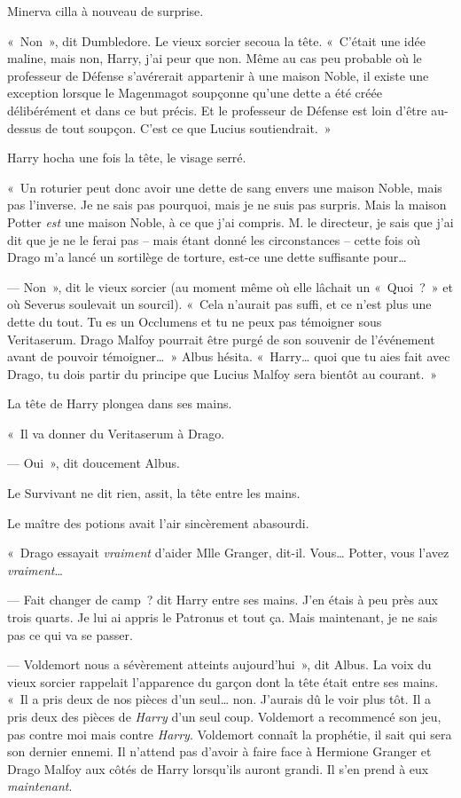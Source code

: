 Minerva cilla à nouveau de surprise.

«~Non~», dit Dumbledore.
Le vieux sorcier secoua la tête.
«~C'était une idée maline, mais non, Harry, j'ai peur que non.
Même au cas peu probable où le professeur de Défense s'avérerait appartenir à une maison Noble, il existe une exception lorsque le Magenmagot soupçonne qu'une dette a été créée délibérément et dans ce but précis.
Et le professeur de Défense est loin d'être au-dessus de tout soupçon.
C'est ce que Lucius soutiendrait.~»

Harry hocha une fois la tête, le visage serré.

«~Un roturier peut donc avoir une dette de sang envers une maison Noble, mais pas l'inverse.
Je ne sais pas pourquoi, mais je ne suis pas surpris.
Mais la maison Potter \emph{est} une maison Noble, à ce que j'ai compris.
M. le directeur, je sais que j'ai dit que je ne le ferai pas -- mais étant donné les circonstances -- cette fois où Drago m'a lancé un sortilège de torture, est-ce une dette suffisante pour…

--- Non~», dit le vieux sorcier (au moment même où elle lâchait un «~Quoi~?~»
et où Severus soulevait un sourcil).
«~Cela n'aurait pas suffi, et ce n'est plus une dette du tout.
Tu es un Occlumens et tu ne peux pas témoigner sous Veritaserum.
Drago Malfoy pourrait être purgé de son souvenir de l'événement avant de pouvoir témoigner…~»
Albus hésita.
«~Harry… quoi que tu aies fait avec Drago, tu dois partir du principe que Lucius Malfoy sera bientôt au courant.~»

La tête de Harry plongea dans ses mains.

«~Il va donner du Veritaserum à Drago.

--- Oui~», dit doucement Albus.

Le Survivant ne dit rien, assit, la tête entre les mains.

Le maître des potions avait l'air sincèrement abasourdi.

«~Drago essayait \emph{vraiment} d'aider Mlle Granger, dit-il.
Vous… Potter, vous l'avez \emph{vraiment}…

--- Fait changer de camp~? dit Harry entre ses mains.
J'en étais à peu près aux trois quarts.
Je lui ai appris le Patronus et tout ça.
Mais maintenant, je ne sais pas ce qui va se passer.

--- Voldemort nous a sévèrement atteints aujourd'hui~», dit Albus.
La voix du vieux sorcier rappelait l'apparence du garçon dont la tête était entre ses mains.
«~Il a pris deux de nos pièces d'un seul… non.
J'aurais dû le voir plus tôt.
Il a pris deux des pièces de \emph{Harry} d'un seul coup.
Voldemort a recommencé son jeu, pas contre moi mais contre \emph{Harry}.
Voldemort connaît la prophétie, il sait qui sera son dernier ennemi.
Il n'attend pas d'avoir à faire face à Hermione Granger et Drago Malfoy aux côtés de Harry lorsqu'ils auront grandi.
Il s'en prend à eux \emph{maintenant}.

